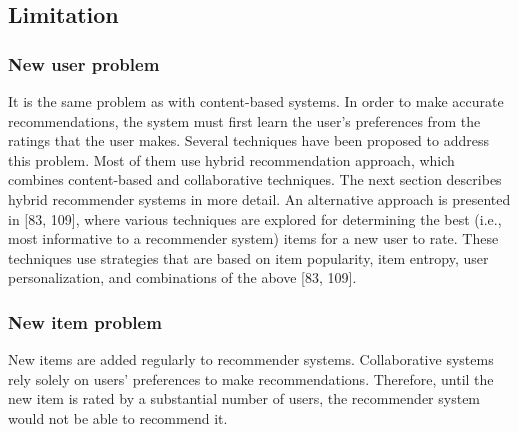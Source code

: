 \subsection{Limitation}
\subsubsection{New user problem}
It is the same problem as with content-based systems. In order to make accurate recommendations, the system must first learn the user’s preferences from the ratings that the user makes. Several techniques have been proposed to address this problem. Most of them use hybrid recommendation approach, which combines content-based and collaborative techniques. The next section describes hybrid recommender systems in more detail. An alternative approach is presented in [83, 109], where various techniques are explored for determining the best (i.e., most informative to a recommender system) items for a new user to rate. These techniques use strategies that are based on item popularity, item entropy, user personalization, and combinations of the above [83, 109].

\subsubsection{New item problem}
New items are added regularly to recommender systems. Collaborative systems rely solely on users’ preferences to make recommendations. Therefore, until the new item is rated by a substantial number of users, the recommender system would not be able to recommend it.

